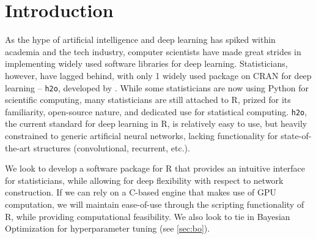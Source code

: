 \documentclass[master]{subfiles}
\begin{document}
\section{Introduction}
As the hype of artificial intelligence and deep learning has spiked within academia and the tech industry, computer scientists have made great strides in implementing widely used software libraries for deep learning.  Statisticians, however, have lagged behind, with only 1 widely used package on CRAN for deep learning -- \lstinline{h2o}, developed by \cite{h2o}.  While some statisticians are now using Python for scientific computing, many statisticians are still attached to R, prized for its familiarity, open-source nature, and dedicated use for statistical computing.  \lstinline{h2o}, the current standard for deep learning in R, is relatively easy to use, but heavily constrained to generic artificial neural networks, lacking functionality for state-of-the-art structures (convolutional, recurrent, etc.).\par
We look to develop a software package for R that provides an intuitive interface for statisticians, while allowing for deep flexibility with respect to network construction.  If we can rely on a C-based engine that makes use of GPU computation, we will maintain ease-of-use through the scripting functionality of R, while providing computational feasibility.  We also look to tie in Bayesian Optimization for hyperparameter tuning (see \ref{sec:bo}).
\end{document}
